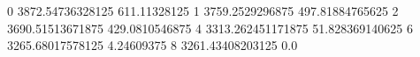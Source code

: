 0 3872.54736328125 611.11328125
1 3759.2529296875 497.81884765625
2 3690.51513671875 429.0810546875
4 3313.262451171875 51.828369140625
6 3265.68017578125 4.24609375
8 3261.43408203125 0.0
